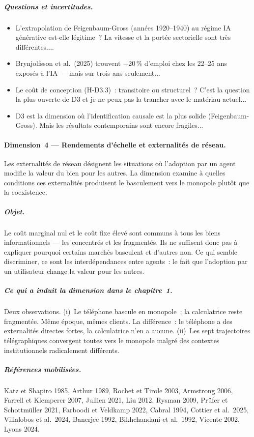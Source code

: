 \subparagraph{Questions et incertitudes.}
\begin{itemize}
\item L'extrapolation de Feigenbaum-Gross (ann\'ees 1920--1940) au r\'egime IA g\'en\'erative est-elle l\'egitime~? La vitesse et la port\'ee sectorielle sont tr\`es diff\'erentes....
\item Brynjolfsson et al.\ (2025) trouvent $-$20\,\% d'emploi chez les 22--25 ans expos\'es \`a l'IA --- mais sur trois ans seulement...
\item Le co\^ut de conception (H-D3.3)~: transitoire ou structurel~? C'est la question la plus ouverte de D3 et je ne peux pas la trancher avec le mat\'eriau actuel...
\item D3 est la dimension o\`u l'identification causale est la plus solide (Feigenbaum-Gross). Mais les r\'esultats contemporains sont encore fragiles...
\end{itemize}


\paragraph{Dimension~4 --- Rendements d'\'echelle et externalit\'es de r\'eseau.}
Les externalit\'es de r\'eseau d\'esignent les situations o\`u l'adoption par un agent modifie la valeur du bien pour les autres. La dimension examine \`a quelles conditions ces externalit\'es produisent le basculement vers le monopole plut\^ot que la coexistence.

\subparagraph{Objet.}
Le co\^ut marginal nul et le co\^ut fixe \'elev\'e sont communs \`a tous les biens informationnels --- les concentr\'es et les fragment\'es. Ils ne suffisent donc pas \`a expliquer pourquoi certains march\'es basculent et d'autres non. Ce qui semble discriminer, ce sont les interd\'ependances entre agents~: le fait que l'adoption par un utilisateur change la valeur pour les autres.

\subparagraph{Ce qui a induit la dimension dans le chapitre~1.}
Deux observations. (i)~Le t\'el\'ephone bascule en monopole~; la calculatrice reste fragment\'ee. M\^eme \'epoque, m\^emes clients. La diff\'erence~: le t\'el\'ephone a des externalit\'es directes fortes, la calculatrice n'en a aucune. (ii)~Les sept trajectoires t\'el\'egraphiques convergent toutes vers le monopole malgr\'e des contextes institutionnels radicalement diff\'erents.

\subparagraph{R\'ef\'erences mobilis\'ees.}
Katz et Shapiro 1985, Arthur 1989, Rochet et Tirole 2003, Armstrong 2006, Farrell et Klemperer 2007, Jullien 2021, Liu 2012, Rysman 2009, Pr\"ufer et Schottm\"uller 2021, Farboodi et Veldkamp 2022, Cabral 1994, Cottier et al.\ 2025, Villalobos et al.\ 2024, Banerjee 1992, Bikhchandani et al.\ 1992, Vicente 2002, Lyons 2024.

